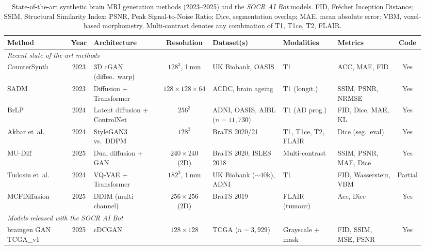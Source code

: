 \documentclass[11pt]{article}
\begin{document}
\begin{table}[!t]
\centering
\footnotesize
\caption{State-of-the-art synthetic brain MRI generation methods (2023--2025) and the \emph{SOCR AI Bot} models. FID, Fr\'echet Inception Distance; SSIM, Structural Similarity Index; PSNR, Peak Signal-to-Noise Ratio; Dice, segmentation overlap; MAE, mean absolute error; VBM, voxel-based morphometry. Multi-contrast denotes any combination of T1, T1ce, T2, FLAIR.}
\label{tab:sota_comparison}
\setlength{\tabcolsep}{4pt}
\begin{tabular}{p{2.7cm}cp{2.3cm}cp{2.2cm}p{2.0cm}p{2.6cm}c}
\toprule
\textbf{Method} & \textbf{Year} & \textbf{Architecture} & \textbf{Resolution} & \textbf{Dataset(s)} & \textbf{Modalities} & \textbf{Metrics} & \textbf{Code} \\
\midrule
\multicolumn{8}{l}{\textit{Recent state-of-the-art methods}} \\
\midrule
CounterSynth\cite{pombo2023equitable} & 2023 & 3D cGAN (diffeo.\ warp) & $128^{3}$, 1\,mm & UK Biobank, OASIS & T1 & ACC, MAE, FID & Yes \\
SADM\cite{yoon2023sadm} & 2023 & Diffusion + Transformer & $128\!\times\!128\!\times\!64$ & ACDC, brain ageing & T1 (longit.) & SSIM, PSNR, NRMSE & Yes \\
BrLP\cite{puglisi2024brlp} & 2024 & Latent diffusion + ControlNet & $256^{3}$ & ADNI, OASIS, AIBL ($n\!=\!11{,}730$) & T1 (AD prog.) & FID, Dice, MAE, KL & Yes \\
Akbar et~al.\cite{akbar2024brain} & 2024 & StyleGAN3 vs.\ DDPM & $128^{3}$ & BraTS 2020/21 & T1, T1ce, T2, FLAIR & Dice (seg.\ eval) & Yes \\
MU-Diff\cite{dayarathna2025mudiff} & 2025 & Dual diffusion + GAN & $240\!\times\!240$ (2D) & BraTS 2020, ISLES 2018 & Multi-contrast & SSIM, PSNR, MAE, Dice & Yes \\
Tudosiu et~al.\cite{tudosiu2024realistic} & 2024 & VQ-VAE + Transformer & $182^{3}$, 1\,mm & UK Biobank ($\sim$40k), ADNI & T1 & FID, Wasserstein, VBM & Partial \\
MCFDiffusion\cite{zuo2025multichannel} & 2025 & DDIM (multi-channel) & $256\!\times\!256$ (2D) & BraTS 2019 & FLAIR (tumour) & Acc, Dice & Yes \\
\midrule
\multicolumn{8}{l}{\textit{Models released with the \emph{SOCR AI Bot}}} \\
\midrule
braingen GAN TCGA\_v1 & 2025 & cDCGAN & $128\!\times\!128$ & TCGA ($n\!=\!3{,}929$) & Grayscale + mask & FID, SSIM, MSE, PSNR & Yes \\

\end{tabular}
\end{table}
\end{document}
